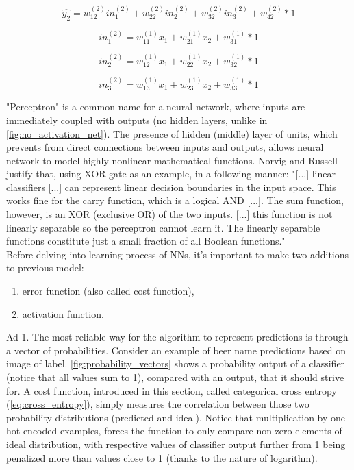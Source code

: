 \documentclass[11pt, a4paper]{article}
\begin{document}
\begin{equation} \label{eq:y_hat_2}
\hat{y_2} = w_{12}^{(2)}in_1^{(2)} + w_{22}^{(2)}in_2^{(2)} + w_{32}^{(2)}in_3^{(2)} + w_{42}^{(2)} * 1 
\end{equation}

\begin{equation} \label{eq:in_1}
in_1^{(2)} = w_{11}^{(1)}x_1 + w_{21}^{(1)}x_2 + w_{31}^{(1)} * 1 
\end{equation}

\begin{equation} \label{eq:in_2}
in_2^{(2)} = w_{12}^{(1)}x_1 + w_{22}^{(1)}x_2 + w_{32}^{(1)} * 1 
\end{equation}

\begin{equation} \label{eq:in_3}
in_3^{(2)} = w_{13}^{(1)}x_1 + w_{23}^{(1)}x_2 + w_{33}^{(1)} * 1 
\end{equation}

"Perceptron" is a common name for a neural network, where inputs are immediately coupled with outputs (no hidden layers, unlike in \autoref{fig:no_activation_net}). The presence of hidden (middle) layer of units, which prevents from direct connections between inputs and outputs, allows neural network to model highly nonlinear mathematical functions. Norvig and Russell justify that, using XOR gate as an example, in a following manner: "[...] linear classifiers [...] can represent linear decision boundaries in the input space. This works fine for the carry function, which is a logical AND [...]. The sum function, however, is an XOR (exclusive OR) of the two inputs. [...] this function is not linearly separable so the perceptron cannot learn it. The linearly separable functions constitute just a small fraction of all Boolean functions." \cite{ai_modern_approach}\\

Before delving into learning process of NNs, it's important to make two additions to previous model:
\begin{enumerate}[1)]
\item error function (also called cost function),
\item activation function.
\end{enumerate}
Ad 1. The most reliable way for the algorithm to represent predictions is through a vector of probabilities. Consider an example of beer name predictions based on image of label. \autoref{fig:probability_vectors} shows a probability output of a classifier (notice that all values sum to 1), compared with an output, that it should strive for. A cost function, introduced in this section, called categorical cross entropy (\autoref{eq:cross_entropy}), simply measures the correlation between those two probability distributions (predicted and ideal). Notice that multiplication by one-hot encoded examples, forces the function to only compare non-zero elements of ideal distribution, with respective values of classifier output further from 1 being penalized more than values close to 1 (thanks to the nature of logarithm).\\ 
\end{document}
